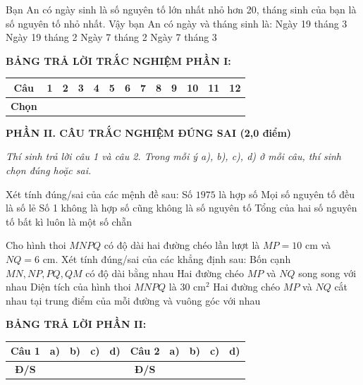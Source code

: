 \documentclass[12pt,a4paper]{article}
\begin{document}
\begin{ex}
Bạn An có ngày sinh là số nguyên tố lớn nhất nhỏ hơn 20, tháng sinh của bạn là số nguyên tố nhỏ nhất. Vậy bạn An có ngày và tháng sinh là:
\choice
{Ngày 19 tháng 3}
{\True Ngày 19 tháng 2}
{Ngày 7 tháng 2}
{Ngày 7 tháng 3}
\end{ex}


\vspace{1mm}
\noindent\textbf{BẢNG TRẢ LỜI TRẮC NGHIỆM PHẦN I:}
\begin{center}
\begin{tabular}{|c|c|c|c|c|c|c|c|c|c|c|c|c|}
\hline
\textbf{Câu} & \textbf{1} & \textbf{2} & \textbf{3} & \textbf{4} & \textbf{5} & \textbf{6} & \textbf{7} & \textbf{8} & \textbf{9} & \textbf{10} & \textbf{11} & \textbf{12} \\
\hline
\textbf{Chọn} & \rule{0pt}{0.65cm} & & & & & & & & & & & \\
\hline
\end{tabular}
\end{center}
\vspace{2mm}

\setcounter{ex}{0}
\noindent\textbf{\large PHẦN II. CÂU TRẮC NGHIỆM ĐÚNG SAI (2,0 điểm)}

\textit{Thí sinh trả lời câu 1 và câu 2. Trong mỗi ý a), b), c), d) ở mỗi câu, thí sinh chọn đúng hoặc sai.}

\vspace{1mm}
\begin{ex}
Xét tính đúng/sai của các mệnh đề sau:
\choiceTF
{\True Số $1975$ là hợp số}
{Mọi số nguyên tố đều là số lẻ}
{\True Số 1 không là hợp số cũng không là số nguyên tố}
{Tổng của hai số nguyên tố bất kì luôn là một số chẵn}
\end{ex}

\begin{ex}
Cho hình thoi $MNPQ$ có độ dài hai đường chéo lần lượt là $MP = 10\text{ cm}$ và $NQ = 6\text{ cm}$. Xét tính đúng/sai của các khẳng định sau:
\choiceTF
{\True Bốn cạnh $MN, NP, PQ, QM$ có độ dài bằng nhau}
{Hai đường chéo $MP$ và $NQ$ song song với nhau}
{\True Diện tích của hình thoi $MNPQ$ là $30\text{ cm}^2$}
{\True Hai đường chéo $MP$ và $NQ$ cắt nhau tại trung điểm của mỗi đường và vuông góc với nhau}
\end{ex}


\noindent\textbf{BẢNG TRẢ LỜI PHẦN II:}
\begin{center}
\begin{tabular}{|c|c|c|c|c||c|c|c|c|c|}
\hline
\textbf{Câu 1} & \textbf{a)} & \textbf{b)} & \textbf{c)} & \textbf{d)} & \textbf{Câu 2} & \textbf{a)} & \textbf{b)} & \textbf{c)} & \textbf{d)} \\
\hline
\textbf{Đ/S} & \rule{0pt}{0.6cm} & & & & \textbf{Đ/S} & & & & \\
\hline
\end{tabular}
\end{center}
\vspace{2mm}
\end{document}
